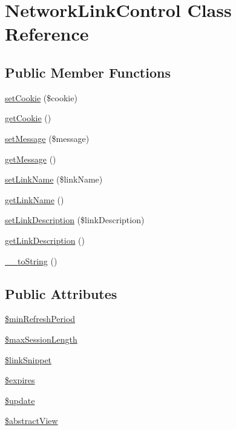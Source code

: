 \hypertarget{classNetworkLinkControl}{
\section{NetworkLinkControl Class Reference}
\label{de/d14/classNetworkLinkControl}
}
\subsection*{Public Member Functions}
\begin{DoxyCompactItemize}
\item 
\hyperlink{classNetworkLinkControl_ae7c412d1fc1b246bee452e9124b658a5}{setCookie} (\$cookie)
\item 
\hyperlink{classNetworkLinkControl_a134c45a5e457a1c7c3299c50879b069e}{getCookie} ()
\item 
\hyperlink{classNetworkLinkControl_aa21794097295dffcd892d4778c8d5e8f}{setMessage} (\$message)
\item 
\hyperlink{classNetworkLinkControl_a6c267a3c1ba6d5c97706524d4417096b}{getMessage} ()
\item 
\hyperlink{classNetworkLinkControl_a194d0be803d91bc343c648087f4b6869}{setLinkName} (\$linkName)
\item 
\hyperlink{classNetworkLinkControl_a5c1582e0a7a7bbc368ed76c3f38f5843}{getLinkName} ()
\item 
\hyperlink{classNetworkLinkControl_a8feaf73a3e7e2ce9cc702457fd723f7b}{setLinkDescription} (\$linkDescription)
\item 
\hyperlink{classNetworkLinkControl_a6b3f6774eb08fc46332e0ba1f9c1c61b}{getLinkDescription} ()
\item 
\hyperlink{classNetworkLinkControl_adcc67618517077d430d676f8b5f9e429}{\_\-\_\-toString} ()
\end{DoxyCompactItemize}
\subsection*{Public Attributes}
\begin{DoxyCompactItemize}
\item 
\hyperlink{classNetworkLinkControl_a4d2f5e9945fc607a1fa9ae50b5436cc1}{\$minRefreshPeriod}
\item 
\hyperlink{classNetworkLinkControl_a9adfe9a64125d8109551b1972cbdda67}{\$maxSessionLength}
\item 
\hyperlink{classNetworkLinkControl_a190f5462b9a696cdab79d4c14217f82f}{\$linkSnippet}
\item 
\hyperlink{classNetworkLinkControl_a98910c79b8b53a5babb85bdc8e051e68}{\$expires}
\item 
\hyperlink{classNetworkLinkControl_aea10b81f86df7701b3d4b42a5821ba1d}{\$update}
\item 
\hyperlink{classNetworkLinkControl_a7078d6975f5bf7c82afbbad5eabe07b8}{\$abstractView}
\end{DoxyCompactItemize}


